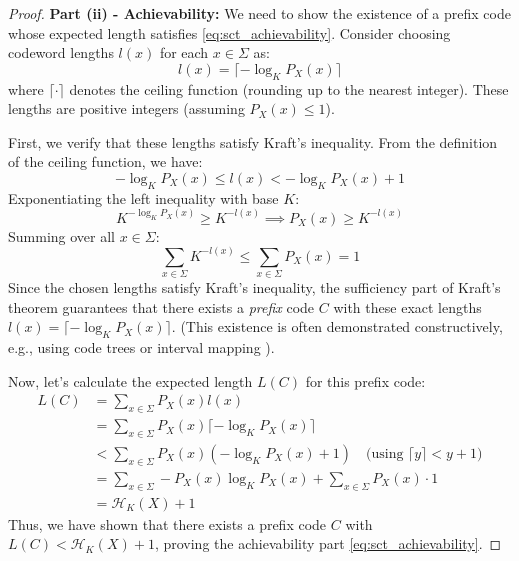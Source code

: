 \begin{proof}
    \textbf{Part (ii) - Achievability:}
    We need to show the existence of a prefix code whose expected length satisfies \eqref{eq:sct_achievability}. Consider choosing codeword lengths $l(x)$ for each $x \in \Sigma$ as:
    \begin{equation}\label{eq:shannon_length_choice_revised}
        l(x) = \lceil -\log_K P_X(x) \rceil
    \end{equation}
    where $\lceil \cdot \rceil$ denotes the ceiling function (rounding up to the nearest integer). These lengths are positive integers (assuming $P_X(x) \le 1$).

    First, we verify that these lengths satisfy Kraft's inequality. From the definition of the ceiling function, we have:
    \begin{equation}
        -\log_K P_X(x) \le l(x) < -\log_K P_X(x) + 1
    \end{equation}
    Exponentiating the left inequality with base $K$:
    \begin{equation}
        K^{-\log_K P_X(x)} \ge K^{-l(x)} \implies P_X(x) \ge K^{-l(x)}
    \end{equation}
    Summing over all $x \in \Sigma$:
    \begin{equation}
        \sum_{x \in \Sigma} K^{-l(x)} \le \sum_{x \in \Sigma} P_X(x) = 1
    \end{equation}
    Since the chosen lengths satisfy Kraft's inequality, the sufficiency part of Kraft's theorem guarantees that there exists a \emph{prefix} code $C$ with these exact lengths $l(x) = \lceil -\log_K P_X(x) \rceil$. (This existence is often demonstrated constructively, e.g., using code trees or interval mapping \cite{ElementsofInformationTheory,han2002mathematics}).

    Now, let's calculate the expected length $L(C)$ for this prefix code:
    \begin{align}
        L(C) & = \sum_{x \in \Sigma} P_X(x) l(x)                                                                                    \\
             & = \sum_{x \in \Sigma} P_X(x) \lceil -\log_K P_X(x) \rceil                                                            \\
             & < \sum_{x \in \Sigma} P_X(x) \left( -\log_K P_X(x) + 1 \right) \quad \text{(using } \lceil y \rceil < y + 1 \text{)} \\
             & = \sum_{x \in \Sigma} -P_X(x) \log_K P_X(x) + \sum_{x \in \Sigma} P_X(x) \cdot 1                                     \\
             & = \mathcal{H}_K(X) + 1
    \end{align}
    Thus, we have shown that there exists a prefix code $C$ with $L(C) < \mathcal{H}_K(X) + 1$, proving the achievability part \eqref{eq:sct_achievability}.
\end{proof}

